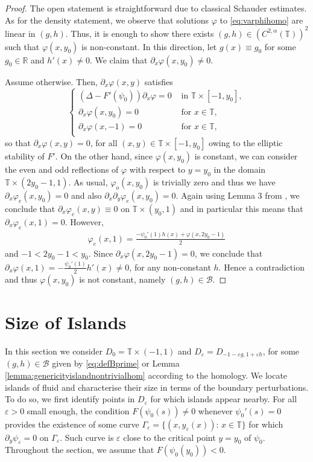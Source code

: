 \documentclass[11pt,reqno]{amsproc}
\newcommand{\R}{\mathbb{R}}
\newcommand{\ve}{\varepsilon}
\numberwithin{equation}{section}
\numberwithin{theorem}{section}
\numberwithin{prop}{section}
\numberwithin{cor}{section}
\numberwithin{lemma}{section}
\theoremstyle{remark}
\theoremstyle{definition}
\begin{document}
\begin{proof}
    The open statement is straightforward due to classical Schauder estimates.  As for the density statement, we observe that solutions $\varphi$ to  \eqref{eq:varphihomo} are linear in $(g,h)$. Thus, it is enough to show there exists $(g,h)\in (C^{2,\alpha}(\mathbb{T}))^2$ such that $\varphi(x,y_0)$ is non-constant.  In this direction, let $g(x)\equiv g_0$ for some $g_0\in \R$ and $h'(x)\neq 0$. We claim that $\partial_x\varphi(x,y_0)\neq 0$. 

Assume otherwise. Then, $\partial_x\varphi(x,y)$ satisfies
\begin{equation}
\begin{cases}
\left(\Delta-F'(\psi_0)\right)\partial_x\varphi = 0 & \text{ in } \mathbb{T}\times[-1,y_0], \\
\partial_x\varphi(x,y_0)= 0 & \text{ for } x\in \mathbb{T}, \\
\partial_x\varphi(x,-1)= 0 & \text{ for } x\in\mathbb{T}, \\
\end{cases}
\end{equation}
so that $\partial_x\varphi(x,y)=0$, for all $(x,y)\in \mathbb{T}\times[-1,y_0]$ owing to the elliptic stability of $F'$. On the other hand, since $\varphi(x,y_0)$ is constant, we can consider the even and odd reflections of $\varphi$ with respect to $y=y_0$ in the domain $\mathbb{T}\times(2y_0-1,1)$. As usual, $\varphi_o(x,y_0)$ is trivially zero and thus we have $\partial_x\varphi_e(x,y_0)=0$ and also $\partial_x\partial_y\varphi_e(x,y_0)=0$. Again using Lemma 3 from \cite{drivas2024islands}, we conclude that $\partial_x\varphi_e(x,y)\equiv 0$ on $\mathbb{T}\times(y_0,1)$ and in particular this means that $\partial_x\varphi_e(x,1)=0$. However, 
\begin{align*}
\varphi_e(x,1) = \frac{-\psi_0'(1)h(x) + \varphi(x,2y_0-1)}{2}
\end{align*}
and $-1<2y_0-1<y_0$. Since $\partial_x\varphi(x,2y_0-1) = 0$, we conclude that $\partial_x\varphi(x,1) = -\frac{\psi_0'(1)}{2}h'(x)\neq 0$, for any non-constant $h$. Hence a contradiction and thus $\varphi(x,y_0)$ is not constant, namely $(g,h)\in \mathcal{B}$.
\end{proof}


\section{Size of Islands}\label{sec:sizeislands}
In this section we consider $D_0=\mathbb{T}\times(-1,1)$ and $D_\ve=D_{-1-\ve g, 1+\ve h}$, for some $(g,h)\in \mathcal{B}$ given by \eqref{eq:defBprime} or Lemma \ref{lemma:genericityislandnontrivialhom} according to the homology. We locate islands of fluid and characterise their size in terms of the boundary perturbations. To do so, we first identify points in $D_\ve$ for which islands appear nearby. For all $\ve>0$ small enough, the condition $F(\psi_0(s))\neq 0$ whenever $\psi_0'(s)=0$ provides the existence of some curve $\Gamma_\ve=\lbrace (x,y_\ve(x)):\, x\in \mathbb{T} \rbrace$ for which $\partial_y\psi_\ve=0$ on $\Gamma_\ve$.  Such curve is $\ve$ close to the critical point $y=y_0$ of $\psi_0$. Throughout the section, we assume that $F(\psi_0(y_0))<0$.
\end{document}
